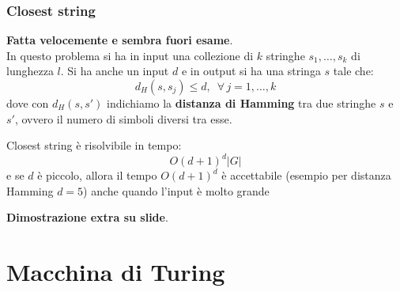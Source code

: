 \documentclass[a4paper,12pt, oneside]{book}
\begin{document}
\subsection{Closest string}
\textbf{Fatta velocemente e sembra fuori esame}.\\
In questo problema si ha in input una collezione di $k$ stringhe
$s_1,\ldots,s_k$ di lunghezza $l$. Si ha anche un input $d$ e in output si ha
una stringa $s$ tale che:
\[d_H(s,s_j)\leq d,\,\,\,\forall\,j= 1,\ldots,k\]
dove con $d_H(s,s')$ indichiamo la \textbf{distanza di Hamming} tra due stringhe
$s$ e $s'$, ovvero il numero di simboli diversi tra esse.
\begin{teorema}
  Closest string è risolvibile in tempo:
  \[O(d+1)^d|G|\]
  e se $d$ è piccolo, allora il tempo $O(d+1)^d$ è accettabile (esempio per
  distanza Hamming $d = 5$) anche quando l’input è molto grande  
\end{teorema}
\textbf{Dimostrazione extra su slide}.
\chapter{Macchina di Turing}
\end{document}

